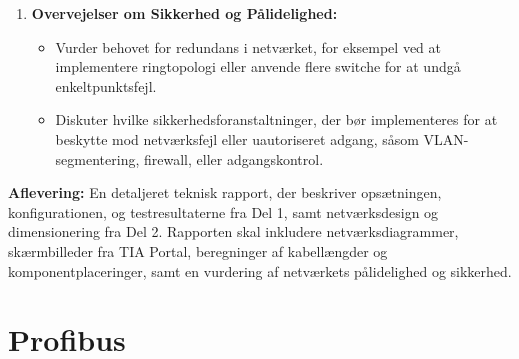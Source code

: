 \begin{enumerate}
	\item \textbf{Overvejelser om Sikkerhed og Pålidelighed:}
	\begin{itemize}
		\item Vurder behovet for redundans i netværket, for eksempel ved at implementere ringtopologi eller anvende flere switche for at undgå enkeltpunktsfejl.
		\item Diskuter hvilke sikkerhedsforanstaltninger, der bør implementeres for at beskytte mod netværksfejl eller uautoriseret adgang, såsom VLAN-segmentering, firewall, eller adgangskontrol.
	\end{itemize}
\end{enumerate}

\noindent\textbf{Aflevering:} En detaljeret teknisk rapport, der beskriver opsætningen, konfigurationen, og testresultaterne fra Del 1, samt netværksdesign og dimensionering fra Del 2. Rapporten skal inkludere netværksdiagrammer, skærmbilleder fra TIA Portal, beregninger af kabellængder og komponentplaceringer, samt en vurdering af netværkets pålidelighed og sikkerhed.


\section{Profibus}
